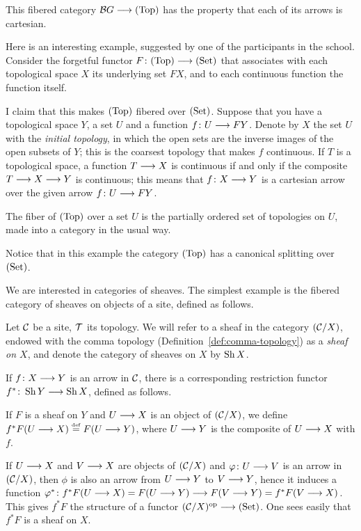 \begin{3   FIBERED CATEGORIES}
\begin{3.2 Examples of fibered categories}
\begin{example}
This fibered category $\cB G \arr \cattop$ has the property that each of its arrows is cartesian.
\end{example}

\begin{example}
Here is an interesting example, suggested by one of the participants in the school. Consider the forgetful functor $F \colon \cattop \arr \catset$ that associates with each topological space $X$ its underlying set $FX$, and to each continuous function the function itself.

I claim that this makes $(\mathrm{Top})$ fibered over $(\mathrm{Set})$. Suppose that you have a topological space $Y$, a set $U$ and a function $f \colon U \arr FY$. Denote by $X$ the set $U$ with the \emph{initial topology}, in which the open sets are the inverse images of the open subsets of $Y$; this is the coarsest topology that makes $f$ continuous. If $T$ is a topological space, a function $T \arr X$ is continuous if and only if the composite $T \arr X \arr Y$ is continuous; this means that $f \colon X \arr Y$ is a cartesian arrow over the given arrow $f \colon U \arr FY$.

The fiber of $(\mathrm{Top})$ over a set $U$ is the partially ordered set of topologies on $U$, made into a category in the usual way.

Notice that in this example the category $(\mathrm{Top})$ has a canonical splitting over $(\mathrm{Set})$.
\end{example}

We are interested in categories of sheaves. The simplest example is the fibered category of sheaves on objects of a site, defined as follows.



\begin{example}\label{ex:fibered-sheaves}
Let $\mathcal{C}$ be a site, $\mathcal{T}$ its topology. We will refer to a sheaf in the category $(\mathcal{C}/X)$, endowed with the comma topology (Definition~\ref{def:comma-topology}) as a \emph{sheaf on $X$}, and denote the category of sheaves on $X$ by $\operatorname{Sh}{X}$.


If $f \colon X \arr Y$ is an arrow in $\mathcal{C}$, there is a corresponding restriction functor $f^* \colon \sh{Y} \arr \sh{X}$, defined as follows.

If $F$ is a sheaf on $Y$ and $U \arr X$ is an object of $(\mathcal{C}/X)$, we define $f^*F(U \arr X) \eqdef F(U \arr Y)$, where $U \arr Y$ is the composite of $U \arr X$ with $f$.

If $U \arr X$ and $V \arr X$ are objects of $(\mathcal{C}/X)$ and $\phi \colon U \arr V$ is an arrow in $(\mathcal{C}/X)$, then $\phi$ is also an arrow from $U \arr Y$ to $V \arr Y$, hence it induces a function $\phi^* \colon f^*F(U \arr X) = F(U \arr Y) \arr F(V \arr Y) = f^*F(V \arr X)$. This gives $f^*F$ the structure of a functor $(\cC/X)\op \arr \catset$. One sees easily that $f^*F$ is a sheaf on $X$.


\end{example}
\end{3.2 Examples of fibered categories}
\end{3   FIBERED CATEGORIES}
